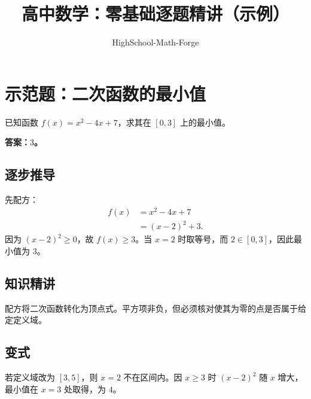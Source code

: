 \documentclass[UTF8,11pt,a4paper]{ctexart}
\title{高中数学：零基础逐题精讲（示例）}
\author{HighSchool-Math-Forge}
\date{}
\begin{document}
\maketitle
\tableofcontents
\section{示范题：二次函数的最小值}
已知函数 $f(x)=x^2-4x+7$，求其在 $[0,3]$ 上的最小值。
\par\textcolor{answerred}{\bfseries 答案：$3$。}
\subsection{逐步推导}
先配方：
\begin{align}
f(x)&=x^2-4x+7\\
&=(x-2)^2+3.
\end{align}
因为 $(x-2)^2\ge 0$，故 $f(x)\ge 3$。当 $x=2$ 时取等号，而 $2\in[0,3]$，因此最小值为 $3$。
\subsection{知识精讲}
配方将二次函数转化为顶点式。平方项非负，但必须核对使其为零的点是否属于给定定义域。
\subsection{变式}
若定义域改为 $[3,5]$，则 $x=2$ 不在区间内。因 $x\ge3$ 时 $(x-2)^2$ 随 $x$ 增大，最小值在 $x=3$ 处取得，为 $4$。
\end{document}
